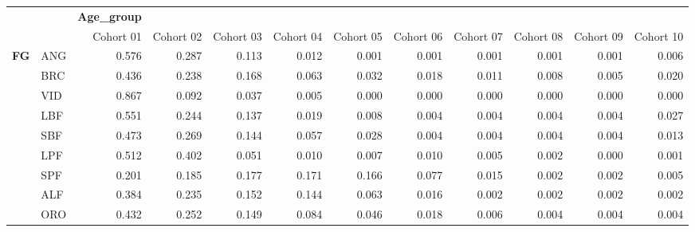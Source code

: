 \documentclass[11pt]{article}
\begin{document}
\begin{itemize}
\begin{center}
\begin{tabular}{llrrrrrrrrrr}
              &       &  \textbf{Age_group}  &             &             &             &             &             &             &             &             &             \\
              &       &           Cohort 01  &  Cohort 02  &  Cohort 03  &  Cohort 04  &  Cohort 05  &  Cohort 06  &  Cohort 07  &  Cohort 08  &  Cohort 09  &  Cohort 10  \\
\hline
 \textbf{FG}  &  ANG  &               0.576  &      0.287  &      0.113  &      0.012  &      0.001  &      0.001  &      0.001  &      0.001  &      0.001  &      0.006  \\
              &  BRC  &               0.436  &      0.238  &      0.168  &      0.063  &      0.032  &      0.018  &      0.011  &      0.008  &      0.005  &      0.020  \\
              &  VID  &               0.867  &      0.092  &      0.037  &      0.005  &      0.000  &      0.000  &      0.000  &      0.000  &      0.000  &      0.000  \\
              &  LBF  &               0.551  &      0.244  &      0.137  &      0.019  &      0.008  &      0.004  &      0.004  &      0.004  &      0.004  &      0.027  \\
              &  SBF  &               0.473  &      0.269  &      0.144  &      0.057  &      0.028  &      0.004  &      0.004  &      0.004  &      0.004  &      0.013  \\
              &  LPF  &               0.512  &      0.402  &      0.051  &      0.010  &      0.007  &      0.010  &      0.005  &      0.002  &      0.000  &      0.001  \\
              &  SPF  &               0.201  &      0.185  &      0.177  &      0.171  &      0.166  &      0.077  &      0.015  &      0.002  &      0.002  &      0.005  \\
              &  ALF  &               0.384  &      0.235  &      0.152  &      0.144  &      0.063  &      0.016  &      0.002  &      0.002  &      0.002  &      0.002  \\
              &  ORO  &               0.432  &      0.252  &      0.149  &      0.084  &      0.046  &      0.018  &      0.006  &      0.004  &      0.004  &      0.004  \\
\end{tabular}
\end{center}




\end{itemize}
\end{document}
